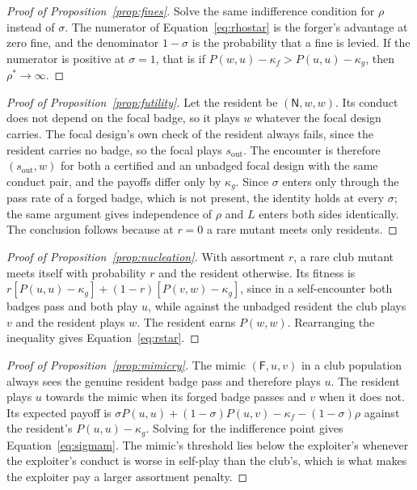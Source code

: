 \documentclass[11pt,a4paper]{article}
\theoremstyle{definition}
\begin{document}
\begin{proof}[Proof of Proposition~\ref{prop:fines}]
Solve the same indifference condition for $\rho$ instead of $\sigma$. The
numerator of Equation~\eqref{eq:rhostar} is the forger's advantage at zero
fine, and the denominator $1 - \sigma$ is the probability that a fine is
levied. If the numerator is positive at $\sigma = 1$, that is if
$P(w,u) - \kappa_f > P(u,u) - \kappa_g$, then $\rho^{*} \to \infty$.
\end{proof}

\begin{proof}[Proof of Proposition~\ref{prop:futility}]
Let the resident be $(\mathsf{N}, w, w)$. Its conduct does not depend on the
focal badge, so it plays $w$ whatever the focal design carries. The focal
design's own check of the resident always fails, since the resident carries no
badge, so the focal plays $s_{\mathrm{out}}$. The encounter is therefore
$(s_{\mathrm{out}}, w)$ for both a certified and an unbadged focal design with
the same conduct pair, and the payoffs differ only by $\kappa_g$. Since
$\sigma$ enters only through the pass rate of a forged badge, which is not
present, the identity holds at every $\sigma$; the same argument gives
independence of $\rho$ and $L$ enters both sides identically. The conclusion
follows because at $r = 0$ a rare mutant meets only residents.
\end{proof}

\begin{proof}[Proof of Proposition~\ref{prop:nucleation}]
With assortment $r$, a rare club mutant meets itself with probability $r$ and
the resident otherwise. Its fitness is
$r[P(u,u) - \kappa_g] + (1-r)[P(v,w) - \kappa_g]$, since in a self-encounter
both badges pass and both play $u$, while against the unbadged resident the
club plays $v$ and the resident plays $w$. The resident earns $P(w,w)$.
Rearranging the inequality gives Equation~\eqref{eq:rstar}.
\end{proof}

\begin{proof}[Proof of Proposition~\ref{prop:mimicry}]
The mimic $(\mathsf{F}, u, v)$ in a club population always sees the genuine
resident badge pass and therefore plays $u$. The resident plays $u$ towards
the mimic when its forged badge passes and $v$ when it does not.
Its expected payoff is $\sigma P(u,u) + (1-\sigma) P(u,v) - \kappa_f -
(1-\sigma)\rho$ against the resident's $P(u,u) - \kappa_g$. Solving for the
indifference point gives Equation~\eqref{eq:sigmam}. The mimic's threshold lies
below the exploiter's whenever the exploiter's conduct is worse in self-play
than the club's, which is what makes the exploiter pay a larger assortment
penalty.
\end{proof}
\end{document}
